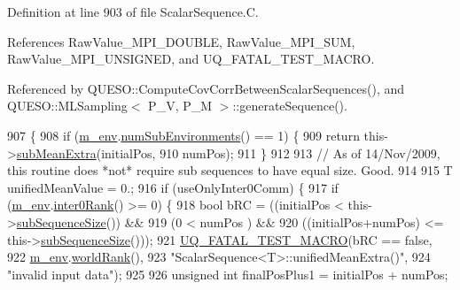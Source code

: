 Definition at line 903 of file Scalar\-Sequence.\-C.



References Raw\-Value\-\_\-\-M\-P\-I\-\_\-\-D\-O\-U\-B\-L\-E, Raw\-Value\-\_\-\-M\-P\-I\-\_\-\-S\-U\-M, Raw\-Value\-\_\-\-M\-P\-I\-\_\-\-U\-N\-S\-I\-G\-N\-E\-D, and U\-Q\-\_\-\-F\-A\-T\-A\-L\-\_\-\-T\-E\-S\-T\-\_\-\-M\-A\-C\-R\-O.



Referenced by Q\-U\-E\-S\-O\-::\-Compute\-Cov\-Corr\-Between\-Scalar\-Sequences(), and Q\-U\-E\-S\-O\-::\-M\-L\-Sampling$<$ P\-\_\-\-V, P\-\_\-\-M $>$\-::generate\-Sequence().


\begin{DoxyCode}
907 \{
908   \textcolor{keywordflow}{if} (\hyperlink{class_q_u_e_s_o_1_1_scalar_sequence_a71618cd6351b29361b437af68447a4c8}{m\_env}.\hyperlink{class_q_u_e_s_o_1_1_base_environment_ac0345f57e31ef7833e379ed972bd094d}{numSubEnvironments}() == 1) \{
909     \textcolor{keywordflow}{return} this->\hyperlink{class_q_u_e_s_o_1_1_scalar_sequence_a65e9208ee2d0443ad28b29141297153c}{subMeanExtra}(initialPos,
910                               numPos);
911   \}
912 
913   \textcolor{comment}{// As of 14/Nov/2009, this routine does *not* require sub sequences to have equal size. Good.}
914 
915   T unifiedMeanValue = 0.;
916   \textcolor{keywordflow}{if} (useOnlyInter0Comm) \{
917     \textcolor{keywordflow}{if} (\hyperlink{class_q_u_e_s_o_1_1_scalar_sequence_a71618cd6351b29361b437af68447a4c8}{m\_env}.\hyperlink{class_q_u_e_s_o_1_1_base_environment_ae106b5bb8a80b655b88b3a26b1e7c185}{inter0Rank}() >= 0) \{
918       \textcolor{keywordtype}{bool} bRC = ((initialPos          <  this->\hyperlink{class_q_u_e_s_o_1_1_scalar_sequence_a0288ea295eedc216a1617b3286f6f3a0}{subSequenceSize}()) &&
919                   (0                   <  numPos                 ) &&
920                   ((initialPos+numPos) <= this->\hyperlink{class_q_u_e_s_o_1_1_scalar_sequence_a0288ea295eedc216a1617b3286f6f3a0}{subSequenceSize}()));
921       \hyperlink{_defines_8h_a56d63d18d0a6d45757de47fcc06f574d}{UQ\_FATAL\_TEST\_MACRO}(bRC == \textcolor{keyword}{false},
922                           \hyperlink{class_q_u_e_s_o_1_1_scalar_sequence_a71618cd6351b29361b437af68447a4c8}{m\_env}.\hyperlink{class_q_u_e_s_o_1_1_base_environment_a78b57112bbd0e6dd0e8afec00b40ffa7}{worldRank}(),
923                           \textcolor{stringliteral}{"ScalarSequence<T>::unifiedMeanExtra()"},
924                           \textcolor{stringliteral}{"invalid input data"});
925 
926       \textcolor{keywordtype}{unsigned} \textcolor{keywordtype}{int} finalPosPlus1 = initialPos + numPos;

\end{DoxyCode}
